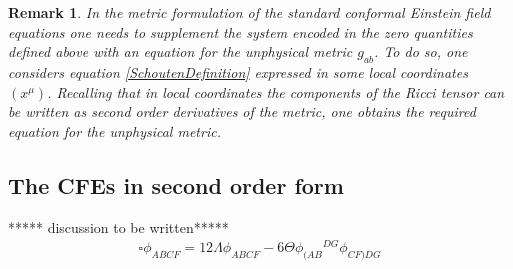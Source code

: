 \documentclass[10pt,a4paper]{article}
\theoremstyle{plain}
\newtheorem{remark}{Remark}
\begin{document}
\begin{remark}
\emph{ In the metric formulation of the standard conformal Einstein field
  equations one needs to supplement the system encoded in the zero
  quantities defined above with an equation for the unphysical metric
  $g_{ab}$. To do so, one considers equation
  \eqref{SchoutenDefinition} expressed in some local coordinates
  $(x^{\mu})$. Recalling that in local coordinates the components of
  the Ricci tensor can be written as second order derivatives of the
  metric, one obtains the required equation for the unphysical metric.
}
\end{remark}

{\color{blue}
\subsection{The CFEs in second order form}

***** discussion to be written*****
\begin{eqnarray}
  \square \phi _{ABCF} = 12 \Lambda  \phi _{ABCF}  -6 \Theta  \phi _{(AB}{}^{DG}\phi _{CF)DG}
  \label{Wave_eq_CFE_Weyl}
\end{eqnarray}
}




\end{document}
